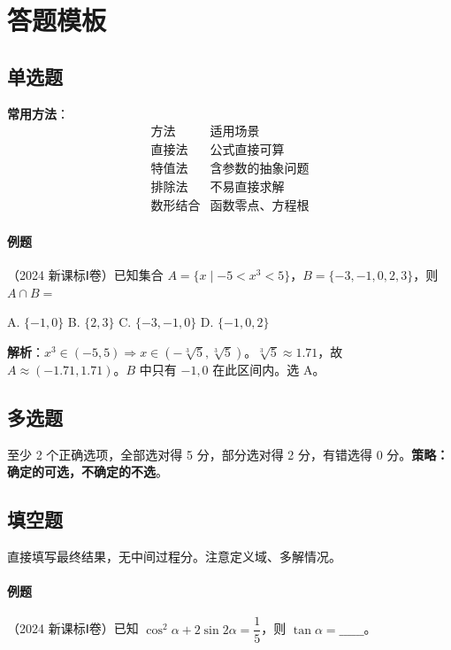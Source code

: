 \section{答题模板}

\subsection{单选题}

\textbf{常用方法}：
\[
\begin{array}{c|c}
\text{方法} & \text{适用场景} \\ \hline
\text{直接法} & \text{公式直接可算} \\
\text{特值法} & \text{含参数的抽象问题} \\
\text{排除法} & \text{不易直接求解} \\
\text{数形结合} & \text{函数零点、方程根}
\end{array}
\]

\paragraph{例题}（2024 新课标Ⅰ卷）已知集合 $A = \{x \mid -5 < x^3 < 5\}$，$B = \{-3,-1,0,2,3\}$，则 $A \cap B =$

A. $\{-1,0\}$ \quad B. $\{2,3\}$ \quad C. $\{-3,-1,0\}$ \quad D. $\{-1,0,2\}$

\textbf{解析}：$x^3 \in (-5,5) \Rightarrow x \in (-\sqrt[3]{5},\sqrt[3]{5})$。$\sqrt[3]{5} \approx 1.71$，故 $A \approx (-1.71, 1.71)$。$B$ 中只有 $-1,0$ 在此区间内。\quad 选 A。

\subsection{多选题}

至少 2 个正确选项，全部选对得 5 分，部分选对得 2 分，有错选得 0 分。\textbf{策略：确定的可选，不确定的不选}。

\subsection{填空题}

直接填写最终结果，无中间过程分。注意定义域、多解情况。

\paragraph{例题}（2024 新课标Ⅰ卷）已知 $\cos^2\alpha + 2\sin2\alpha = \dfrac15$，则 $\tan\alpha = \_\_\_\_\_\_$。

